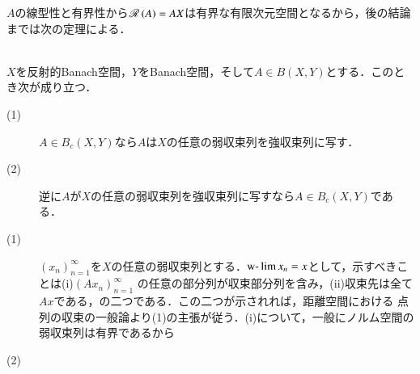 	\begin{prf}
		$A$の線型性と有界性から$\Ran{A} = AX$は有界な有限次元空間となるから，後の結論までは次の定理による．
		\QED
	\end{prf}
	
	
	\begin{itembox}[l]{}
		\begin{thm}[反射的Banach空間上のコンパクト作用素は弱収束列を強収束列に写す]\mbox{}\\
			$X$を反射的Banach空間，$Y$をBanach空間，そして$A \in B(X,Y)$とする．このとき次が成り立つ．
			\begin{description}
				\item[(1)] $A \in B_c(X,Y)$なら$A$は$X$の任意の弱収束列を強収束列に写す．
				\item[(2)] 逆に$A$が$X$の任意の弱収束列を強収束列に写すなら$A \in B_c(X,Y)$である．
			\end{description}
		\end{thm}
	\end{itembox}
	
	\begin{prf}
		\begin{description}
			\item[(1)] $(x_n)_{n=1}^{\infty}$を$X$の任意の弱収束列とする．$\mbox{w-}\lim x_n = x$として，示すべきことは(i)$(Ax_n)_{n=1}^{\infty}$
				の任意の部分列が収束部分列を含み，(ii)収束先は全て$Ax$である，の二つである．この二つが示されれば，距離空間における
				点列の収束の一般論より(1)の主張が従う．(i)について，一般にノルム空間の弱収束列は有界であるから
			\item[(2)]
		\end{description}
	\end{prf}